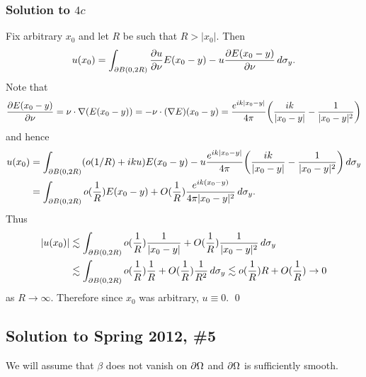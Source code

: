 \subsubsection*{Solution to $4c$}
Fix arbitrary $x_{0}$ and let $R$ be such that $R > |x_{0}|$. Then
$$u(x_{0}) = \int_{\partial B(0, 2R)}\frac{\partial u}{\partial \nu}E(x_{0} - y) - u\frac{\partial E(x_{0} - y)}{\partial \nu}\, d\sigma_{y}.$$
Note that
\begin{align*}
\frac{\partial E(x_{0} - y)}{\partial \nu} = \nu \cdot \nabla(E(x_{0} - y)) = -\nu \cdot (\nabla E)(x_{0} - y) = \frac{e^{ik|x_{0} - y|}}{4\pi}\bigg(\frac{ik}{|x_{0} - y|} - \frac{1}{|x_{0} - y|^{2}}\bigg)
\end{align*}
and hence
\begin{align*}
u(x_{0}) &= \int_{\partial B(0, 2R)}(o(1/R) + iku)E(x_{0} - y) - u\frac{e^{ik|x_{0} - y|}}{4\pi}\bigg(\frac{ik}{|x_{0} - y|} - \frac{1}{|x_{0} - y|^{2}}\bigg)\, d\sigma_{y}\\
&=\int_{\partial B(0, 2R)}o(\frac{1}{R})E(x_{0} - y) + O(\frac{1}{R})\frac{e^{ik(x_{0} - y)}}{4\pi|x_{0} - y|^{2}}\, d\sigma_{y}.
\end{align*}
Thus
\begin{align*}
|u(x_{0})| &\lesssim \int_{\partial B(0, 2R)}o(\frac{1}{R})\frac{1}{|x_{0} - y|} + O(\frac{1}{R})\frac{1}{|x_{0} - y|^{2}}\, d\sigma_{y}\\
&\lesssim \int_{\partial B(0, 2R)}o(\frac{1}{R})\frac{1}{R} + O(\frac{1}{R})\frac{1}{R^{2}}\, d\sigma_{y} \lesssim o(\frac{1}{R})R + O(\frac{1}{R}) \rightarrow 0
\end{align*}
as $R \rightarrow \infty$. Therefore since $x_{0}$ was arbitrary, $u \equiv 0$.
\hfill\qed

\subsection*{Solution to Spring 2012, \#5}\label{s125}
We will assume that $\beta$ does not vanish on $\partial\Omega$ and $\partial\Omega$ is sufficiently smooth.
